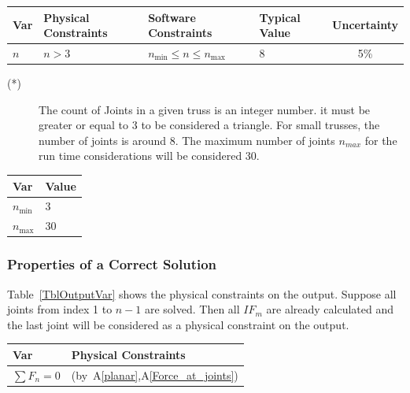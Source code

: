 \documentclass[12pt]{article}
\newcommand{\aref}[1]{A\ref{#1}}
\begin{document}
\begin{table}[!h]
  \caption{Input Variables} \label{TblInputVar}
  \renewcommand{\arraystretch}{1.2}
\noindent \begin{longtable*}{l l l l c} 
  \toprule
  \textbf{Var} & \textbf{Physical Constraints} & \textbf{Software Constraints} &
                             \textbf{Typical Value} & \textbf{Uncertainty}\\
  \midrule 
  $n$ & $n > 3$ & $n_{\text{min}} \leq n \leq n_{\text{max}}$ & 8  & 5\%
  \\
  \bottomrule
\end{longtable*}
\end{table}

\noindent 
\begin{description}

\item[(*)] The count of Joints in a given truss is an integer number. it must be greater or equal to 3 to be considered a triangle. For small trusses, the number of joints is around 8. The maximum number of joints $n_{max}$ for the run time considerations will be considered 30.
\end{description}

\begin{table}[!h]
\caption{Specification Parameter Values} \label{TblSpecParams}
\renewcommand{\arraystretch}{1.2}
\noindent \begin{longtable*}{l l} 
  \toprule
  \textbf{Var} & \textbf{Value} \\
  \midrule 
  $n_\text{min}$ & 3 \\
  $n_\text{max}$ & 30\\
  \bottomrule
\end{longtable*}
\end{table}

\subsubsection{Properties of a Correct Solution} \label{sec_CorrectSolution}

\noindent
Table~\ref{TblOutputVar} shows the physical constraints on the output. Suppose all joints from index 1 to $n-1$ are solved. Then all $IF_{m}$ are already calculated and the last joint will be considered as a physical constraint on the output.

\begin{table}[!h]
\caption{Output Variables} \label{TblOutputVar}
\renewcommand{\arraystretch}{1.2}
\noindent \begin{longtable*}{l l} 
  \toprule
  \textbf{Var} & \textbf{Physical Constraints} \\
  \midrule 
  $\sum F_{n}=0$ &  (by~\aref{planar},\aref{Force_at_joints})
  \\
  \bottomrule
\end{longtable*}
\end{table}
\end{document}
